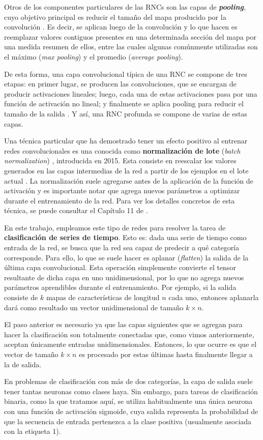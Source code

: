 \documentclass[../../main.tex]{subfiles}
\begin{document}
Otros de los componentes particulares de las RNCs son las capas de
\textbf{\textit{pooling}}, cuyo objetivo principal es reducir el tamaño del mapa producido
por la convolución \cite{hands-on-ML-sklearn-tf}. Es decir, se aplican luego de la
convolución y lo que hacen es reemplazar valores contiguos presentes en una determinada
sección del mapa por una medida resumen de ellos, entre las cuales algunas comúnmente
utilizadas son el máximo (\textit{max pooling}) y el promedio (\textit{average pooling}).

De esta forma, una capa convolucional típica de una RNC se compone de tres etapas: en
primer lugar, se producen las convoluciones, que se encargan de producir activaciones
lineales; luego, cada una de estas activaciones pasa por una función de activación no
lineal; y finalmente se aplica pooling para reducir el tamaño de la salida
\cite{deep-learning}. Y así, una RNC profunda se compone de varias de estas capas.

\medskip
Una técnica particular que ha demostrado tener un efecto positivo al entrenar redes
convolucionales es una conocida como \textbf{normalización de lote} (\textit{batch
normalization}) \cite{batch-norm} \cite{deep-learning} \cite{hands-on-ML-sklearn-tf},
introducida en 2015. Esta consiste en reescalar los valores generados en las capas
intermedias de la red a partir de los ejemplos en el lote actual
\cite{ai-a-modern-approach}. La normalización suele agregarse antes de la aplicación de la
función de activación y es importante notar que agrega nuevos parámetros a optimizar
durante el entrenamiento de la red. Para ver los detalles concretos de esta técnica, se
puede consultar el Capítulo 11 de \cite{hands-on-ML-sklearn-tf}.

\bigskip
En este trabajo, empleamos este tipo de redes para resolver la tarea de
\textbf{clasificación de series de tiempo}. Esto es: dada una serie de tiempo como entrada
de la red, se busca que la red sea capaz de predecir a qué categoría corresponde. Para
ello, lo que se suele hacer es aplanar (\textit{flatten}) la salida de la última capa
convolucional. Esta operación simplemente convierte el tensor resultante de dicha capa en
uno unidimensional, por lo que no agrega nuevos parámetros aprendibles durante el
entrenamiento. Por ejemplo, si la salida consiste de \(k\) mapas de características de
longitud \(n\) cada uno, entonces aplanarla dará como resultado un vector unidimensional
de tamaño \(k \times n\).

El paso anterior es necesario ya que las capas siguientes que se agregan para hacer la
clasificación son totalmente conectadas que, como vimos anteriormente, aceptan únicamente
entradas unidimensionales. Entonces, lo que ocurre es que el vector de tamaño \(k \times
n\) es procesado por estas últimas hasta finalmente llegar a la de salida.

En problemas de clasificación con más de dos categorías, la capa de salida suele tener
tantas neuronas como clases haya. Sin embargo, para tareas de clasificación binaria, como
la que tratamos aquí, se utiliza habitualmente una única neurona con una función de
activación sigmoide, cuya salida representa la probabilidad de que la secuencia de entrada
pertenezca a la clase positiva (usualmente asociada con la etiqueta 1).
\end{document}
